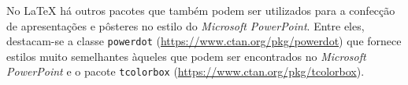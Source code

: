 \begin{marker}
No \LaTeX{} há outros pacotes que também podem ser utilizados para a confecção de apresentações e pôsteres no estilo do \textit{Microsoft PowerPoint}. Entre eles, destacam-se a classe {\tt powerdot} (\url{https://www.ctan.org/pkg/powerdot}) que fornece estilos muito semelhantes àqueles que podem ser encontrados no \textit{Microsoft PowerPoint} e o pacote {\tt tcolorbox} (\url{https://www.ctan.org/pkg/tcolorbox}).
\end{marker}
